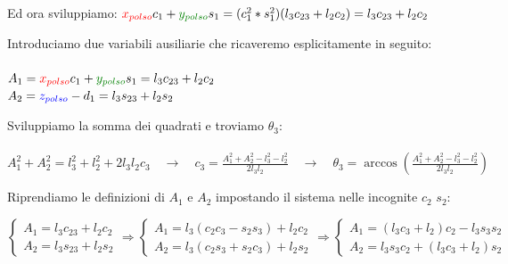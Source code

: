 \documentclass[a4paper]{article}
\begin{document}
    \begin{text}
        Ed ora sviluppiamo: \quad $\textcolor{red}{x_{polso}} c_1 + \textcolor[rgb]{0.004, 0.5, 0.004}{y_{polso}} s_1 = (c_1^2 * s_1^2)(l_3 c_{23} + l_2 c_2) = l_3 c_{23} + l_2 c_2$\\
    \end{text}
    
    \begin{text}
        Introduciamo due variabili ausiliarie che ricaveremo esplicitamente in seguito:\\ \\
        $A_1 = \textcolor{red}{x_{polso}} c_1 + \textcolor[rgb]{0.004, 0.5, 0.004}{y_{polso}} s_1 =l_3 c_{23} + l_2 c_2$\\
        $A_2 = \textcolor{blue}{z_{polso}} - d_1 = l_3 s_{23} + l_2 s_2$\\
    \end{text}
    
    \begin{text}
        Sviluppiamo la somma dei quadrati e troviamo $\theta_3$:\\ \\
        $A_1^2 + A_2^2 = l_3^2 + l_2^2 + 2 l_3 l_2 c_3 \quad \rightarrow \quad c_3 = \frac{A_1^2 + A_2^2 - l_3^2 - l_2^2}{2 l_3 l_2} \quad \rightarrow \quad \theta_3 = \arccos(\frac{A_1^2 + A_2^2 - l_3^2 - l_2^2}{2 l_3 l_2})$\\
    \end{text}
    
    \begin{text}
        Riprendiamo le definizioni di $A_1$ e $A_2$ impostando il sistema nelle incognite $c_2$ $s_2$:
    \end{text}
    
    \begin{equation*}
        \begin{cases}
            A_1 = l_3 c_{23} + l_2 c_2 \\
            A_2 = l_3 s_{23} + l_2 s_2
        \end{cases}
        \Longrightarrow
        \begin{cases}
            A_1 = l_3 (c_2 c_3 - s_2 s_3) + l_2 c_2 \\
            A_2 = l_3 (c_2 s_3 + s_2 c_3)  + l_2 s_2
        \end{cases}
        \Longrightarrow
        \begin{cases}
            A_1 = (l_3 c_3 + l_2) c_2 - l_3 s_3 s_2 \\
            A_2 = l_3 s_3 c_2 + (l_3 c_3 + l_2) s_2 
        \end{cases}
    \end{equation*}
    
\end{document}
